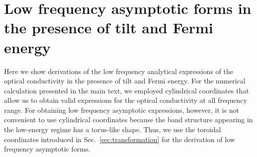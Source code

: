 \documentclass[aps,twocolumn,floatfix]{revtex4-1}
\begin{document}
\section{Low frequency asymptotic forms in the presence of tilt and Fermi energy}
\label{sec:asymptotic_forms}
Here we show derivations of the low frequency analytical expressions of the optical conductivity in the presence of tilt and Fermi energy. For the numerical calculation presented in the main text, we employed cylindrical coordinates that allow us to obtain valid expressions for the optical conductivity at all frequency range. For obtaining low frequency asymptotic expressions, however, it is not convenient to use cylindrical coordinates because the band structure appearing in the low-energy regime has a torus-like shape. Thus, we use the toroidal coordinates introduced in Sec.~\ref{sec:transformation} for the derivation of low frequency asymptotic forms.
\end{document}

